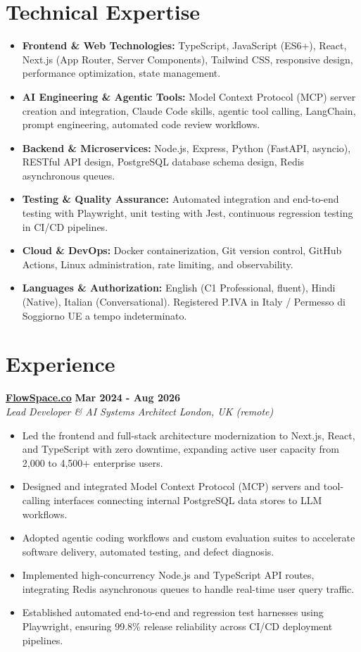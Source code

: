 \documentclass[10pt,a4paper]{article}
\newcommand{\role}[4]{%
  \textbf{#1} \hfill \textbf{#2}\\[1pt]%
  \textit{#3} \hfill \textit{#4}\\[2pt]%
}
\begin{document}
\section{Technical Expertise}
\begin{itemize}
  \item \textbf{Frontend \& Web Technologies:} TypeScript, JavaScript (ES6+), React, Next.js (App Router, Server Components), Tailwind CSS, responsive design, performance optimization, state management.
  \item \textbf{AI Engineering \& Agentic Tools:} Model Context Protocol (MCP) server creation and integration, Claude Code skills, agentic tool calling, LangChain, prompt engineering, automated code review workflows.
  \item \textbf{Backend \& Microservices:} Node.js, Express, Python (FastAPI, asyncio), RESTful API design, PostgreSQL database schema design, Redis asynchronous queues.
  \item \textbf{Testing \& Quality Assurance:} Automated integration and end-to-end testing with Playwright, unit testing with Jest, continuous regression testing in CI/CD pipelines.
  \item \textbf{Cloud \& DevOps:} Docker containerization, Git version control, GitHub Actions, Linux administration, rate limiting, and observability.
  \item \textbf{Languages \& Authorization:} English (C1 Professional, fluent), Hindi (Native), Italian (Conversational). Registered P.IVA in Italy / Permesso di Soggiorno UE a tempo indeterminato.
\end{itemize}

\section{Experience}

\role{\href{https://flowspace.co}{FlowSpace.co}}{Mar 2024 - Aug 2026}{Lead Developer \& AI Systems Architect}{London, UK (remote)}
\begin{itemize}
  \item Led the frontend and full-stack architecture modernization to Next.js, React, and TypeScript with zero downtime, expanding active user capacity from 2,000 to 4,500+ enterprise users.
  \item Designed and integrated Model Context Protocol (MCP) servers and tool-calling interfaces connecting internal PostgreSQL data stores to LLM workflows.
  \item Adopted agentic coding workflows and custom evaluation suites to accelerate software delivery, automated testing, and defect diagnosis.
  \item Implemented high-concurrency Node.js and TypeScript API routes, integrating Redis asynchronous queues to handle real-time user query traffic.
  \item Established automated end-to-end and regression test harnesses using Playwright, ensuring 99.8\% release reliability across CI/CD deployment pipelines.
\end{itemize}
\end{document}
